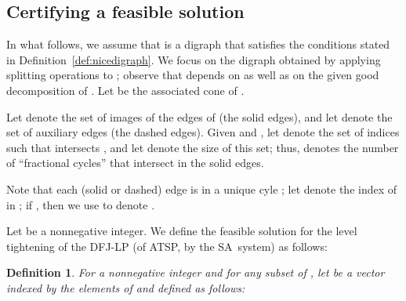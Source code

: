 \documentclass[11pt]{article}
\newtheorem{definition}[theorem]{Definition}
\newcommand{\iSA}{\textsf{SA}}
\begin{document}
{\begin{figure}[htb]
\centering
{}
\caption{}
\label{fig-tour}
\end{figure}
}

\subsection{Certifying a feasible solution}

In what follows, we assume that  is a digraph
that satisfies the conditions stated in
Definition~\ref{def:nicedigraph}.
We focus on the digraph
 obtained by applying splitting operations to ;
observe that  depends on  as well as on
the given good decomposition of . Let  be the associated cone of .

Let  denote the set of images of the edges of  (the solid edges),
and let  denote the set of auxiliary edges (the dashed edges).
Given  and ,
let  denote the
set of indices  such that
 intersects ,
and let  denote the size of this set;
thus,  denotes the number of ``fractional cycles''
that intersect  in the solid edges.

Note that each (solid or dashed) edge  is in a unique cyle ;
let  denote the index of  in ;
if , then we use  to
denote .




Let  be a nonnegative integer.
We define the feasible solution  for
the level~ tightening of the DFJ-LP
(of ATSP, by the \iSA\ system)
as follows:
\begin{definition}\label{def:dfj-feasol}
For a nonnegative integer  and
for any subset  of ,
let  be a vector indexed by the elements of
 and defined as follows:
\label{def:dfj-zvec}

\end{definition}
\end{document}
